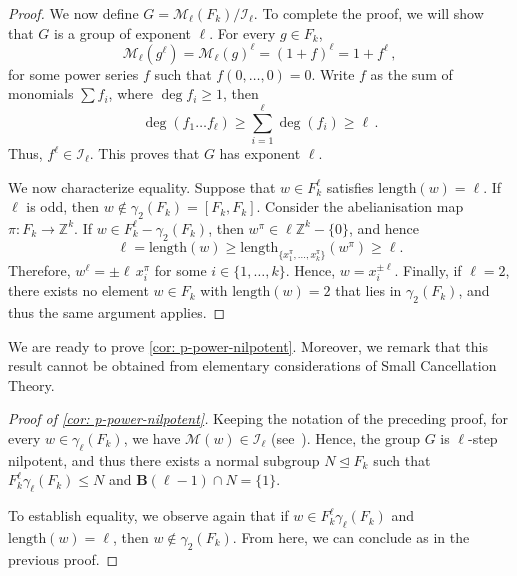 \documentclass[a4paper]{amsart}
\newcommand{\len}{\mathrm{length}}
\newcommand{\B}{\mathbf{B}}
\newcommand{\0}{\mathbf{0}}
\newcommand{\M}{\mathcal{M}}
\theoremstyle{definition}
\begin{document}
\begin{proof}
We now define $G = \M_\ell(F_k) / \mathcal{I}_\ell$.
To complete the proof, we will show that $G$ is a group of exponent $\ell$. For every $g \in F_k$,
\[\M_\ell(g^\ell) = \M_\ell(g)^\ell = (1 + f)^\ell = 1+ f^\ell \,,\]
for some power series $f$ such that $f(0, \dots, 0) = 0$. Write $f$ as the sum of monomials $\sum f_i$, where $\deg f_i \geq 1$, then
\[\deg(f_1 \dots f_{\ell}) \geq \sum_{i=1}^{\ell} \deg(f_i) \geq \ell \,.\]
Thus, $f^\ell \in \mathcal{I}_\ell$. This proves that $G$ has exponent $\ell$. 

We now characterize equality. Suppose that $w \in F_k^\ell$ satisfies $\len(w) = \ell$. If $\ell$ is odd, then $w \notin \gamma_2(F_k) = [F_k,F_k]$. Consider the abelianisation map $\pi \colon F_k \to \mathbb{Z}^k$.  
If $w \in F_k^\ell - \gamma_2(F_k)$, then $w^\pi \in \ell \mathbb{Z}^k - \{0 \}$, and hence
\[
    \ell = \len (w) \geq \len_{\{x_1^\pi, \dots,x_k^\pi\}}(w^\pi) \geq \ell.
\]
Therefore, $w^\ell = \pm \ell \,x_i^\pi$ for some $i \in \{1, \dots, k\}$. Hence, $w = x_i^{\pm \ell}$. Finally, if $\ell = 2$, there exists no element $w\in F_k$ with $\len(w) = 2$ that lies in $\gamma_2(F_k)$, and thus the same argument applies.  
\end{proof}

We are ready to prove \cref{cor: p-power-nilpotent}. Moreover, we remark that this result cannot be obtained from elementary considerations of Small Cancellation Theory.
\begin{proof}[Proof of \cref{cor: p-power-nilpotent}]
Keeping the notation of the preceding proof, for every $w \in \gamma_\ell(F_k)$, we have $\M(w) \in \mathcal{I}_\ell$ (see~\cite[Proposition~10.2]{LyndonSchuppCombinatorial}). Hence, the group $G$ is $\ell$-step nilpotent, and thus there exists a normal subgroup $N \unlhd F_k$ such that $F_k^\ell \gamma_\ell(F_k) \leq N$ and $\B(\ell-1) \cap N=\{1 \}$.

To establish equality, we observe again that if $w \in F_k^{\ell} \gamma_\ell(F_k)$ and $\len(w) = \ell$, then $w \notin \gamma_2(F_k)$. From here, we can conclude as in the previous proof. 
\end{proof}
\end{document}
